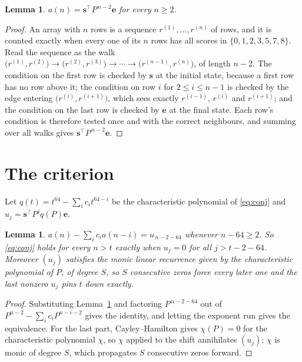 \documentclass[11pt,a4paper]{article}
\theoremstyle{plain}
\newtheorem{lemma}[theorem]{Lemma}
\theoremstyle{definition}
\begin{document}
\begin{lemma}\label{lem:walk}
$a(n)=\mathbf{s}^{\!\top}P^{\,n-2}\mathbf{e}$ for every $n\ge2$.
\end{lemma}

\begin{proof}
An array with $n$ rows is a sequence $r^{(1)},\dots,r^{(n)}$ of rows, and it is counted
exactly when every one of its $n$ rows has all scores in $\{0,1,2,3,5,7,8\}$. Read the sequence as the
walk $\bigl(r^{(1)},r^{(2)}\bigr)\to\bigl(r^{(2)},r^{(3)}\bigr)\to\cdots\to
\bigl(r^{(n-1)},r^{(n)}\bigr)$, of length $n-2$. The condition on the first row is
checked by $\mathbf{s}$ at the initial state, because a first row has no row above it; the
condition on row $i$ for $2\le i\le n-1$ is checked by the edge entering
$\bigl(r^{(i)},r^{(i+1)}\bigr)$, which sees exactly $r^{(i-1)}$, $r^{(i)}$ and
$r^{(i+1)}$; and the condition on the last row is checked by $\mathbf{e}$ at the final
state. Each row's condition is therefore tested once and with the correct neighbours, and
summing over all walks gives $\mathbf{s}^{\!\top}P^{\,n-2}\mathbf{e}$.
\end{proof}

\section{The criterion}

Let $q(t)=t^{64}-\sum_i c_i t^{64-i}$ be the characteristic polynomial of
\eqref{eq:conj} and $u_j=\mathbf{s}^{\!\top}P^{j}q(P)\mathbf{e}$.

\begin{lemma}\label{lem:crit}
$a(n)-\sum_i c_i a(n-i)=u_{\,n-2-64}$ whenever $n-64\ge2$. So \eqref{eq:conj}
holds for every $n>t$ exactly when $u_j=0$ for all $j>t-2-64$. Moreover $(u_j)$
satisfies the monic linear recurrence given by the characteristic polynomial of $P$, of
degree $S$, so $S$ consecutive zeros force every later one and the last nonzero $u_j$ pins
$t$ down exactly.
\end{lemma}

\begin{proof}
Substituting Lemma~\ref{lem:walk} and factoring $P^{\,n-2-64}$ out of
$P^{n-2}-\sum_i c_i P^{n-i-2}$ gives the identity, and letting the exponent run gives the
equivalence. For the last part, Cayley--Hamilton gives $\chi(P)=0$ for the characteristic
polynomial $\chi$, so $\chi$ applied to the shift annihilates $(u_j)$; $\chi$ is monic of
degree $S$, which propagates $S$ consecutive zeros forward.
\end{proof}
\end{document}
